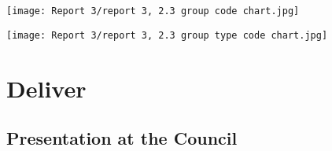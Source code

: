\begin{center}
  \texttt{[image: Report 3/report 3, 2.3 group code chart.jpg]}
\end{center}


\begin{center}
  \texttt{[image: Report 3/report 3, 2.3 group type code chart.jpg]}
\end{center}


	\section{Deliver}
	
		\subsection{Presentation at the Council}
		
